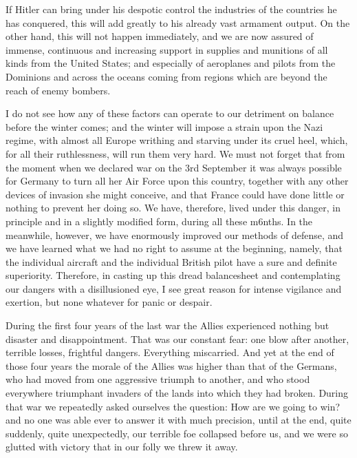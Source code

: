 \documentclass[a4paper]{amsbook}
\begin{document}
If Hitler can bring under his despotic control the industries of the countries he has conquered, this will add greatly to his already vast armament output. On the other hand, this will not happen immediately, and we are now assured of immense, continuous and increasing support in supplies and munitions of all kinds from the United States; and especially of aeroplanes and pilots from the Dominions and across the oceans coming from regions which are beyond the reach of enemy bombers.

I do not see how any of these factors can operate to our detriment on balance before the winter comes; and the winter will impose a strain upon the Nazi regime, with almost all Europe writhing and starving under its cruel heel, which, for all their ruthlessness, will run them very hard. We must not forget that from the moment when we declared war on the 3rd September it was always possible for Germany to turn all her Air Force upon this country, together with any other devices of invasion she might conceive, and that France could have done little or nothing to prevent her doing so. We have, therefore, lived under this danger, in principle and in a slightly modified form, during all these m6nths. In the meanwhile, however, we have enormously improved our methods of defense, and we have learned what we had no right to assume at the beginning, namely, that the individual aircraft and the individual British pilot have a sure and definite superiority. Therefore, in casting up this dread balancesheet and contemplating our dangers with a disillusioned eye, I see great reason for intense vigilance and exertion, but none whatever for panic or despair.

During the first four years of the last war the Allies experienced nothing but disaster and disappointment. That was our constant fear: one blow after another, terrible losses, frightful dangers. Everything miscarried. And yet at the end of those four years the morale of the Allies was higher than that of the Germans, who had moved from one aggressive triumph to another, and who stood everywhere triumphant invaders of the lands into which they had broken. During that war we repeatedly asked ourselves the question: How are we going to win? and no one was able ever to answer it with much precision, until at the end, quite suddenly, quite unexpectedly, our terrible foe collapsed before us, and we were so glutted with victory that in our folly we threw it away.
\end{document}
